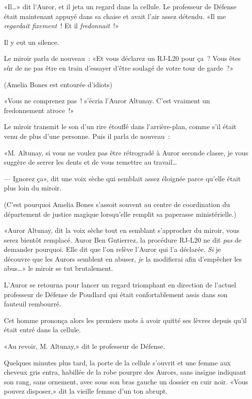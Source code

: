 «Il…» dit l'Auror, et il jeta un regard dans la cellule. Le professeur de Défense était maintenant appuyé dans sa chaise et avait l'air assez détendu. «Il me \emph{regardait fixement}~! Et il \emph{fredonnait}~!»

Il y eut un silence.

Le miroir parla de nouveau~: «Et vous déclarez un RJ-L20 pour ça~? Vous êtes sûr de ne pas être en train d'essayer d'être soulagé de votre tour de garde~?»

(Amelia Bones est entourée d'idiots)

«Vous ne comprenez pas~! s'écria l'Auror Altunay. C'est vraiment un fredonnement atroce~!»

Le miroir transmit le son d'un rire étouffé dans l'arrière-plan, comme s'il était venu de plus d'une personne. Puis il parla de nouveau~:

«M. Altunay, si vous ne voulez pas être rétrogradé à Auror seconde classe, je vous suggère de serrer les dents et de vous remettre au travail…

--- Ignorez ça», dit une voix sèche qui semblait assez éloignée parce qu'elle était plus loin du miroir.

(C'est pourquoi Amelia Bones s'assoit souvent au centre de coordination du département de justice magique lorsqu'elle remplit sa paperasse ministérielle.)

«Auror Altunay, dit la voix sèche tout en semblant s'approcher du miroir, vous serez bientôt remplacé. Auror Ben Gutierrez, la procédure RJ-L20 ne dit \emph{pas} de demander pourquoi. Elle dit que l'on relève l'Auror qui l'a déclarée. \emph{Si} je découvre que les Aurors semblent en abuser, \emph{je} la modifierai afin d'empêcher les abus…» le miroir se tut brutalement.

L'Auror se retourna pour lancer un regard triomphant en direction de l'actuel professeur de Défense de Poudlard qui était confortablement assis dans son fauteuil rembourré.

Cet homme prononça alors les premiers mots à avoir quitté ses lèvres depuis qu'il était entré dans la cellule.

«Au revoir, M. Altunay,» dit le professeur de Défense.

Quelques minutes plus tard, la porte de la cellule s'ouvrit et une femme aux cheveux gris entra, habillée de la robe pourpre des Aurors, sans insigne indiquant son rang, sans ornement, avec sous son bras gauche un dossier en cuir noir. «Vous pouvez disposer,» dit la vieille femme d'un ton abrupt.

